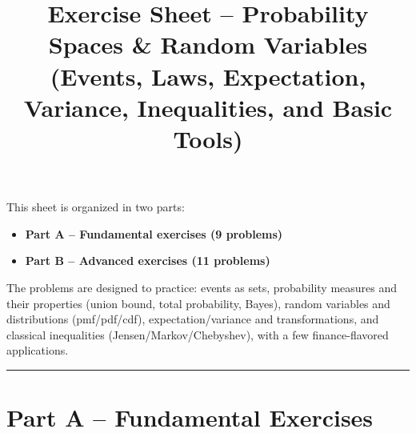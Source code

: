 \documentclass[11pt]{article}
\title{Exercise Sheet -- Probability Spaces \& Random Variables\\[0.4em]
{\large (Events, Laws, Expectation, Variance, Inequalities, and Basic Tools)}}
\author{}
\date{}
\begin{document}
\maketitle

This sheet is organized in two parts:
\begin{itemize}
  \item \textbf{Part A -- Fundamental exercises (9 problems)}
  \item \textbf{Part B -- Advanced exercises (11 problems)}
\end{itemize}

The problems are designed to practice:
events as sets, probability measures and their properties (union bound, total probability, Bayes),
random variables and distributions (pmf/pdf/cdf), expectation/variance and transformations,
and classical inequalities (Jensen/Markov/Chebyshev), with a few finance-flavored applications.

\bigskip
\hrule
\bigskip

\section*{Part A -- Fundamental Exercises}
\end{document}
